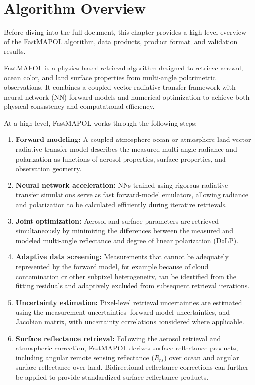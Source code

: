 \documentclass[
  letterpaper,
  open=any]{scrbook}
\begin{document}
\chapter{Algorithm Overview}\label{algorithm-overview}

Before diving into the full document, this chapter provides a high-level
overview of the FastMAPOL algorithm, data products, product format, and
validation results.

FastMAPOL is a physics-based retrieval algorithm designed to retrieve
aerosol, ocean color, and land surface properties from multi-angle
polarimetric observations. It combines a coupled vector radiative
transfer framework with neural network (NN) forward models and numerical
optimization to achieve both physical consistency and computational
efficiency.

At a high level, FastMAPOL works through the following steps:

\begin{enumerate}
\def\labelenumi{\arabic{enumi}.}
\item
  \textbf{Forward modeling:} A coupled atmosphere-ocean or
  atmosphere-land vector radiative transfer model describes the measured
  multi-angle radiance and polarization as functions of aerosol
  properties, surface properties, and observation geometry.
\item
  \textbf{Neural network acceleration:} NNs trained using rigorous
  radiative transfer simulations serve as fast forward-model emulators,
  allowing radiance and polarization to be calculated efficiently during
  iterative retrievals.
\item
  \textbf{Joint optimization:} Aerosol and surface parameters are
  retrieved simultaneously by minimizing the differences between the
  measured and modeled multi-angle reflectance and degree of linear
  polarization (DoLP).
\item
  \textbf{Adaptive data screening:} Measurements that cannot be
  adequately represented by the forward model, for example because of
  cloud contamination or other subpixel heterogeneity, can be identified
  from the fitting residuals and adaptively excluded from subsequent
  retrieval iterations.
\item
  \textbf{Uncertainty estimation:} Pixel-level retrieval uncertainties
  are estimated using the measurement uncertainties, forward-model
  uncertainties, and Jacobian matrix, with uncertainty correlations
  considered where applicable.
\item
  \textbf{Surface reflectance retrieval:} Following the aerosol
  retrieval and atmospheric correction, FastMAPOL derives surface
  reflectance products, including angular remote sensing reflectance
  (\(R_{rs}\)) over ocean and angular surface reflectance over land.
  Bidirectional reflectance corrections can further be applied to
  provide standardized surface reflectance products.
\end{enumerate}
\end{document}

